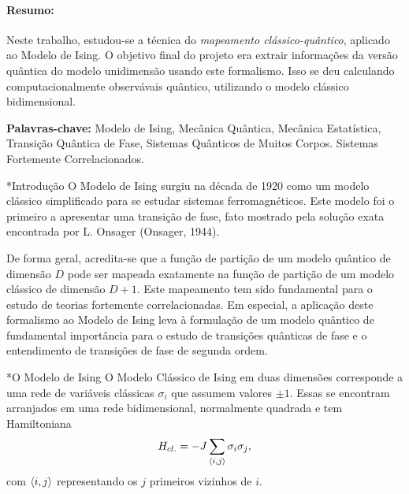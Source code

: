 \documentclass[plainsections,32pt]{sciposter}
\makeatletter
\newcommand{\largo}{\fontsize{36}{40}\selectfont }
\renewcommand\section{\@startsection {section}{1}{\z@}{-1ex \@plus -0.5ex \@minus -.1ex}{0.8ex \@plus.1ex}{\largo\bfseries\fontsize{28}{26}\selectfont}}
\makeatother
\begin{document}
\vspace{1.5cm}
\begin{multicols}{2}
\paragraph{Resumo:} Neste trabalho, estudou-se a técnica do \textit{mapeamento clássico-quântico}, aplicado ao Modelo de Ising. O objetivo final do projeto era extrair informações da versão quântica do modelo unidimensão usando este formalismo. Isso se deu calculando computacionalmente observávais quântico, utilizando o modelo clássico bidimensional.

\textbf{Palavras-chave:} Modelo de Ising, Mecânica Quântica, Mecânica Estatística, Transição Quântica de Fase, Sistemas Quânticos de Muitos Corpos. Sistemas Fortemente Correlacionados.

\section*{Introdução}
O Modelo de Ising surgiu na década de 1920 como um modelo clássico simplificado para se estudar sistemas ferromagnéticos. Este modelo foi o primeiro a apresentar uma transição de fase, fato mostrado pela solução exata encontrada por L. Onsager (Onsager, 1944).

De forma geral, acredita-se que a função de partição de um modelo quântico de dimensão $D$ pode ser mapeada exatamente na função de partição de um modelo clássico de dimensão $D+1$. Este mapeamento tem sido fundamental para o estudo de teorias fortemente correlacionadas. Em especial, a aplicação deste formalismo ao Modelo de Ising leva à formulação de um modelo quântico de fundamental importância para o estudo de transições quânticas de fase e o entendimento de transições de fase de segunda ordem.

\section*{O Modelo de Ising} O Modelo Clássico de Ising em duas dimensões corresponde a uma rede de variáveis clássicas $\sigma_i$ que assumem valores $\pm 1$. Essas se encontram arranjados em uma rede bidimensional, normalmente quadrada e tem Hamiltoniana
\begin{equation}
  H_{cl.} = -J \sum_{\braket{i, j}} \sigma_i \sigma_j,
\end{equation}
com $\braket{i, j}$ representando os $j$ primeiros vizinhos de $i$.


\end{multicols}
\end{document}

